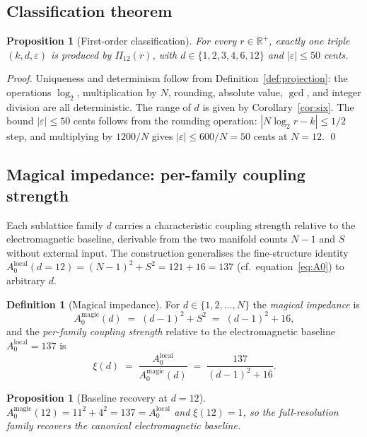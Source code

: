 \documentclass[11pt,a4paper]{article}
\newtheorem{proposition}[theorem]{Proposition}
\theoremstyle{definition}
\newtheorem{definition}[theorem]{Definition}
\theoremstyle{remark}
\newcommand{\R}{\mathbb{R}}
\newcommand{\eps}{\varepsilon}
\begin{document}
\subsection{Classification theorem}

\begin{proposition}[First-order classification]\label{prop:classification}
For every $r\in\R^{+}$, exactly one triple $(k,d,\eps)$ is produced by $\Pi_{12}(r)$, with $d\in\{1,2,3,4,6,12\}$ and $|\eps|\le 50$ cents.
\end{proposition}

\begin{proof}
Uniqueness and determinism follow from Definition~\ref{def:projection}: the operations $\log_{2}$, multiplication by $N$, rounding, absolute value, $\gcd$, and integer division are all deterministic. The range of $d$ is given by Corollary~\ref{cor:six}. The bound $|\eps|\le 50$ cents follows from the rounding operation: $|N\log_{2}r - k|\le 1/2$ step, and multiplying by $1200/N$ gives $|\eps|\le 600/N=50$ cents at $N=12$. \qed
\end{proof}

\subsection{Magical impedance: per-family coupling strength}\label{subsec:impedance}

Each sublattice family $d$ carries a characteristic coupling strength relative to the electromagnetic baseline, derivable from the two manifold counts $N{-}1$ and $S$ without external input. The construction generalises the fine-structure identity $A_{0}^{\text{local}}(d{=}12) = (N{-}1)^{2}+S^{2} = 121+16 = 137$ (cf.\ equation~\eqref{eq:A0}) to arbitrary $d$.

\begin{definition}[Magical impedance]\label{def:magical-impedance}
For $d\in\{1,2,\ldots,N\}$ the \emph{magical impedance} is
\[
A_{0}^{\text{magic}}(d) \;=\; (d-1)^{2} + S^{2} \;=\; (d-1)^{2} + 16,
\]
and the \emph{per-family coupling strength} relative to the electromagnetic baseline $A_{0}^{\text{local}} = 137$ is
\[
\xi(d) \;=\; \frac{A_{0}^{\text{local}}}{A_{0}^{\text{magic}}(d)} \;=\; \frac{137}{(d-1)^{2}+16}.
\]
\end{definition}

\begin{proposition}[Baseline recovery at $d=12$]\label{prop:baseline}
$A_{0}^{\text{magic}}(12) = 11^{2}+4^{2} = 137 = A_{0}^{\text{local}}$ and $\xi(12) = 1$, so the full-resolution family recovers the canonical electromagnetic baseline.
\end{proposition}
\end{document}
